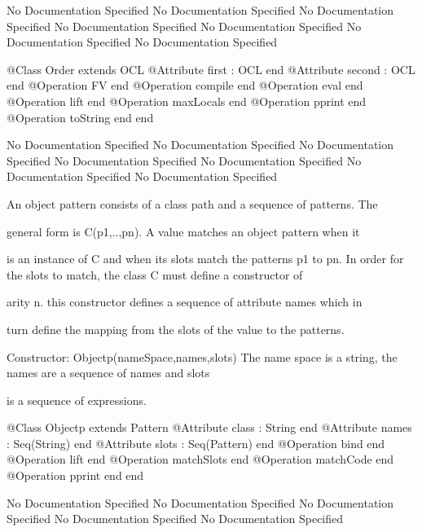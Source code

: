 No Documentation Specified
No Documentation Specified
No Documentation Specified
No Documentation Specified
No Documentation Specified
No Documentation Specified
No Documentation Specified
\begin{Interface}
@Class Order extends OCL
  @Attribute first : OCL end
  @Attribute second : OCL end
  @Operation FV end
  @Operation compile end
  @Operation eval end
  @Operation lift end
  @Operation maxLocals end
  @Operation pprint end
  @Operation toString end
end
\end{Interface}
No Documentation Specified
No Documentation Specified
No Documentation Specified
No Documentation Specified
No Documentation Specified
No Documentation Specified
No Documentation Specified

      An object pattern consists of a class path and a sequence of patterns. The

      general form is C(p1,..,pn). A value matches an object pattern when it

      is an instance of C and when its slots match the patterns p1 to pn. In 
      order for the slots to match, the class C must define a constructor of

      arity n. this constructor defines a sequence of attribute names which in

      turn define the mapping from the slots of the value to the patterns. 
      
      Constructor: Objectp(nameSpace,names,slots)
        The name space is a string, the names are a sequence of names and slots

        is a sequence of expressions.
\begin{Interface}
@Class Objectp extends Pattern
  @Attribute class : String end
  @Attribute names : Seq(String) end
  @Attribute slots : Seq(Pattern) end
  @Operation bind end
  @Operation lift end
  @Operation matchSlots end
  @Operation matchCode end
  @Operation pprint end
end
\end{Interface}
No Documentation Specified
No Documentation Specified
No Documentation Specified
No Documentation Specified
No Documentation Specified

